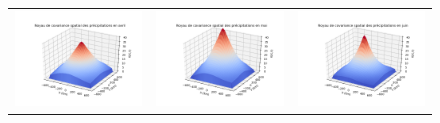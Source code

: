 \documentclass[a4paper,11pt]{article}
\numberwithin{equation}{section}
\begin{document}
\begin{figure}[H]
\begin{tabular}{ccc}
	\includegraphics[scale=0.34]{images/kernel_precip_m4.png} & \includegraphics[scale=0.34]{images/kernel_precip_m5.png} & \includegraphics[scale=0.34]{images/kernel_precip_m6.png} \\

\end{tabular}
\end{figure}
\end{document}
